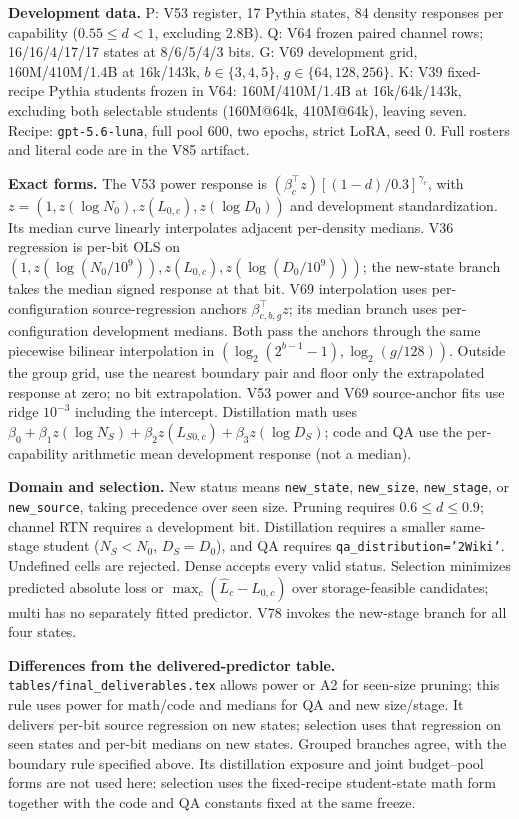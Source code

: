 \noindent\textbf{Development data.} P: V53 register, 17 Pythia states, 84 density responses per capability ($0.55\le d<1$, excluding 2.8B). Q: V64 frozen paired channel rows; 16/16/4/17/17 states at 8/6/5/4/3 bits. G: V69 development grid, 160M/410M/1.4B at 16k/143k, $b\in\{3,4,5\}$, $g\in\{64,128,256\}$. K: V39 fixed-recipe Pythia students frozen in V64: 160M/410M/1.4B at 16k/64k/143k, excluding both selectable students (160M@64k, 410M@64k), leaving seven. Recipe: \texttt{gpt-5.6-luna}, full pool 600, two epochs, strict LoRA, seed 0. Full rosters and literal code are in the V85 artifact.
\par\noindent\textbf{Exact forms.} The V53 power response is $(\beta_c^\top z)[(1-d)/0.3]^{\gamma_c}$, with $z=(1,\allowbreak z(\log N_0),\allowbreak z(L_{0,c}),\allowbreak z(\log D_0))$ and development standardization. Its median curve linearly interpolates adjacent per-density medians. V36 regression is per-bit OLS on $(1,\allowbreak z(\log(N_0/10^9)),\allowbreak z(L_{0,c}),\allowbreak z(\log(D_0/10^9)))$; the new-state branch takes the median signed response at that bit. V69 interpolation uses per-configuration source-regression anchors $\beta_{c,b,g}^\top z$; its median branch uses per-configuration development medians. Both pass the anchors through the same piecewise bilinear interpolation in $(\log_2(2^{b-1}-1),\log_2(g/128))$. Outside the group grid, use the nearest boundary pair and floor only the extrapolated response at zero; no bit extrapolation. V53 power and V69 source-anchor fits use ridge $10^{-3}$ including the intercept. Distillation math uses $\beta_0+\beta_1z(\log N_S)+\beta_2z(L_{S0,c})+\beta_3z(\log D_S)$; code and QA use the per-capability arithmetic mean development response (not a median).
\par\noindent\textbf{Domain and selection.} New status means \texttt{new\_state}, \texttt{new\_size}, \texttt{new\_stage}, or \texttt{new\_source}, taking precedence over seen size. Pruning requires $0.6\le d\le0.9$; channel RTN requires a development bit. Distillation requires a smaller same-stage student ($N_S<N_0$, $D_S=D_0$), and QA requires \texttt{qa\_distribution='2Wiki'}. Undefined cells are rejected. Dense accepts every valid status. Selection minimizes predicted absolute loss or $\max_c(\widehat L_c-L_{0,c})$ over storage-feasible candidates; multi has no separately fitted predictor. V78 invokes the new-stage branch for all four states.
\par\noindent\textbf{Differences from the delivered-predictor table.} \texttt{tables/final\_deliverables.tex} allows power or A2 for seen-size pruning; this rule uses power for math/code and medians for QA and new size/stage. It delivers per-bit source regression on new states; selection uses that regression on seen states and per-bit medians on new states. Grouped branches agree, with the boundary rule specified above. Its distillation exposure and joint budget--pool forms are not used here: selection uses the fixed-recipe student-state math form together with the code and QA constants fixed at the same freeze.
\endgroup
